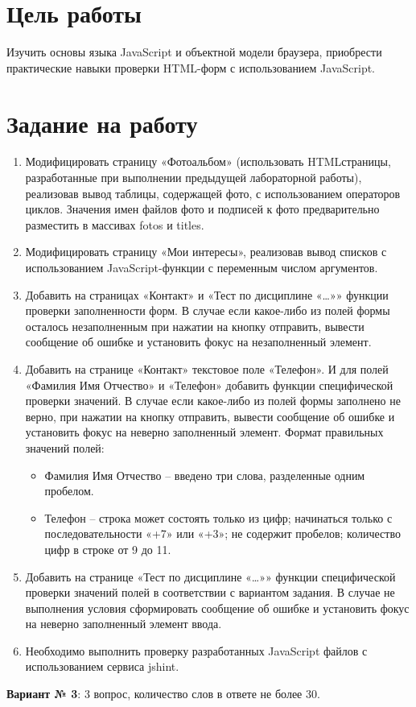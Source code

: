 \documentclass[a4paper,14pt]{extarticle}
\begin{document}


\section{Цель работы}
Изучить основы языка JavaScript и объектной модели браузера,
приобрести практические навыки проверки HTML-форм с использованием
JavaScript.

\section{Задание на работу}
\begin{enumerate}
    \item Модифицировать страницу «Фотоальбом» (использовать
          HTMLстраницы, разработанные при выполнении предыдущей
          лабораторной работы), реализовав вывод таблицы,
          содержащей фото, с использованием операторов циклов.
          Значения имен файлов фото и подписей к фото
          предварительно разместить в массивах fotos и titles.
    \item Модифицировать страницу «Мои интересы», реализовав вывод
          списков с использованием JavaScript-функции с переменным
          числом аргументов.
    \item Добавить на страницах «Контакт» и «Тест по дисциплине «…»»
          функции проверки заполненности форм. В случае если
          какое-либо из полей формы осталось незаполненным при нажатии
          на кнопку отправить, вывести сообщение об ошибке и
          установить фокус на незаполненный элемент.
    \item Добавить на странице «Контакт» текстовое поле «Телефон».
          И для полей «Фамилия Имя Отчество» и «Телефон» добавить
          функции специфической проверки значений. В случае если
          какое-либо из полей формы заполнено не верно, при нажатии
          на кнопку отправить, вывести сообщение об ошибке и установить
          фокус на неверно заполненный элемент. Формат правильных
          значений полей:
          
          \begin{itemize}
              \item Фамилия Имя Отчество – введено три слова,
                    разделенные одним пробелом.
              \item Телефон – строка может состоять только из цифр;
                    начинаться только с последовательности «+7» или «+3»;
                    не содержит пробелов; количество цифр в строке от
                    9 до 11.
          \end{itemize}
    \item Добавить на странице «Тест по дисциплине «…»» функции
          специфической проверки значений полей в соответствии
          с вариантом задания. В случае не выполнения условия
          сформировать сообщение об ошибке и установить фокус
          на неверно заполненный элемент ввода.
    \item Необходимо выполнить проверку разработанных JavaScript
          файлов с использованием сервиса jshint.
\end{enumerate}
\textbf{Вариант № 3}: 3 вопрос, количество слов в ответе не более 30.
\end{document}
